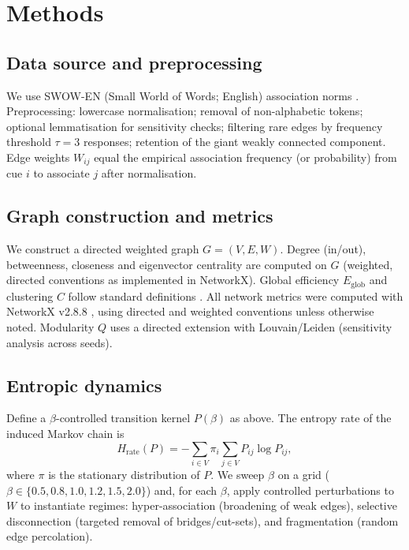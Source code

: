 \documentclass[fleqn,10pt]{wlscirep}
\begin{document}
\section*{Methods}

\subsection*{Data source and preprocessing}
We use SWOW-EN (Small World of Words; English) association norms \cite{DeDeyne2019}. Preprocessing: lowercase normalisation; removal of non-alphabetic tokens; optional lemmatisation for sensitivity checks; filtering rare edges by frequency threshold $\tau=3$ responses; retention of the giant weakly connected component. Edge weights $W_{ij}$ equal the empirical association frequency (or probability) from cue $i$ to associate $j$ after normalisation.

\subsection*{Graph construction and metrics}
We construct a directed weighted graph $G=(V,E,W)$. Degree (in/out), betweenness, closeness and eigenvector centrality are computed on $G$ (weighted, directed conventions as implemented in NetworkX). Global efficiency $E_{\mathrm{glob}}$ and clustering $C$ follow standard definitions \cite{Newman2010Networks,Latora2001PRL}. All network metrics were computed with NetworkX v2.8.8 \cite{NetworkX}, using directed and weighted conventions unless otherwise noted. Modularity $Q$ uses a directed extension with Louvain/Leiden (sensitivity analysis across seeds).

\subsection*{Entropic dynamics}
Define a $\beta$-controlled transition kernel $P(\beta)$ as above. The entropy rate of the induced Markov chain is
\begin{equation}
H_{\mathrm{rate}}(P) = - \sum_{i\in V} \pi_i \sum_{j\in V} P_{ij} \log P_{ij},
\end{equation}
where $\pi$ is the stationary distribution of $P$. We sweep $\beta$ on a grid ($\beta\in\{0.5,0.8,1.0,1.2,1.5,2.0\}$) and, for each $\beta$, apply controlled perturbations to $W$ to instantiate regimes: hyper-association (broadening of weak edges), selective disconnection (targeted removal of bridges/cut-sets), and fragmentation (random edge percolation).
\end{document}
